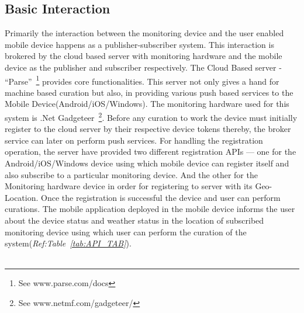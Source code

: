 \documentclass[10pt]{article}
\begin{document}
\subsection*{Basic Interaction}

Primarily the interaction between the monitoring device and the user enabled mobile device happens as a publisher-subscriber system. 
This interaction is brokered by the cloud based server with monitoring hardware and the mobile device as the publisher and subscriber respectively. 
The Cloud Based server - ``Parse''~\footnote{See www.parse.com/docs} provides core functionalities. 
This server not only gives a hand for machine based curation but also, in providing various push based services to the Mobile Device(Android/iOS/Windows).
The monitoring hardware used for this system is .Net Gadgeteer~\footnote{See www.netmf.com/gadgeteer/}. 
Before any curation to work the device must initially register to the cloud server by their respective device tokens thereby, the broker service can later on perform push services. 
For handling the registration operation, the server have provided two different registration APIs --- one for the Android/iOS/Windows device using which mobile device can register itself and also subscribe to a particular monitoring device.
And the other for the Monitoring hardware device in order for registering to server with its Geo-Location. 
Once the registration is successful the device and user can perform curations.
The mobile application deployed in the mobile device informs the user about the device status and weather status in the location of subscribed monitoring device using which user can perform the curation of the system(\emph{Ref:Table~\ref{tab:API_TAB}}).\\ \\
\end{document}
